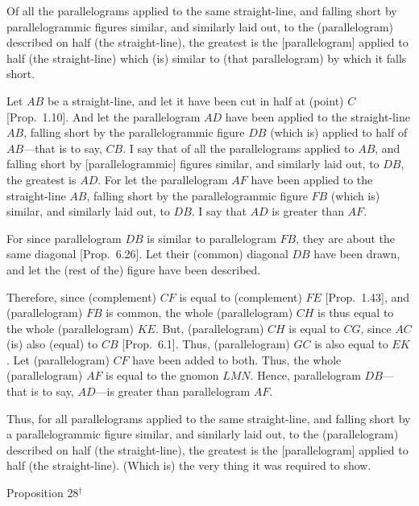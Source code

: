 Of all the parallelograms applied to the
same straight-line, and falling short by parallelogrammic figures
similar, and similarly laid out, to the (parallelogram)
described on half (the straight-line), the greatest is the [parallelogram]
applied to half (the straight-line) which (is) similar to (that parallelogram)
by which it falls short.

Let $AB$ be a straight-line, and let it have been cut in half at
(point) $C$ [Prop.~1.10]. And let the parallelogram $AD$ have been applied to the straight-line
$AB$, 
falling short by the parallelogrammic figure $DB$ (which is) applied to
half of $AB$---that is to say, $CB$. I say that of all  the parallelograms applied to $AB$, and
falling short by  [parallelogrammic] figures similar, and similarly
laid out, to $DB$, the greatest is $AD$. For let the parallelogram
$AF$ have been applied to the straight-line $AB$, falling short by
the parallelogrammic figure $FB$ (which is) similar, and similarly laid out,
to $DB$. I say that $AD$ is greater than $AF$.

\epsfysize=2in
\centerline{}

For since parallelogram $DB$ is similar to parallelogram $FB$, they are
about the same diagonal [Prop.~6.26].
Let their (common) diagonal $DB$ have been drawn, and let the (rest of the)  figure have been
described.

Therefore, since (complement) $CF$ is equal to (complement) $FE$  [Prop.~1.43],
and (parallelogram) $FB$ is common, the whole (parallelogram) $CH$ is thus
equal to the whole (parallelogram) $KE$. But, (parallelogram)
$CH$ is equal to $CG$, since $AC$ (is) also (equal) to $CB$ [Prop.~6.1]. Thus, (parallelogram) $GC$ is also equal to $EK$. 
Let (parallelogram) $CF$ have been added to both. Thus, the whole (parallelogram) $AF$
is equal to the gnomon $LMN$. Hence, parallelogram $DB$---that is
to say, $AD$---is greater than parallelogram $AF$.

Thus, for all parallelograms applied to the
same straight-line, and falling short by a parallelogrammic figure
similar, and similarly laid out, to the (parallelogram)
described on half (the straight-line), the greatest is the [parallelogram]
applied to half (the straight-line). (Which is) the very thing it was required
to show.


\begin{center}
{\large Proposition 28}$^\dag$
\end{center}

